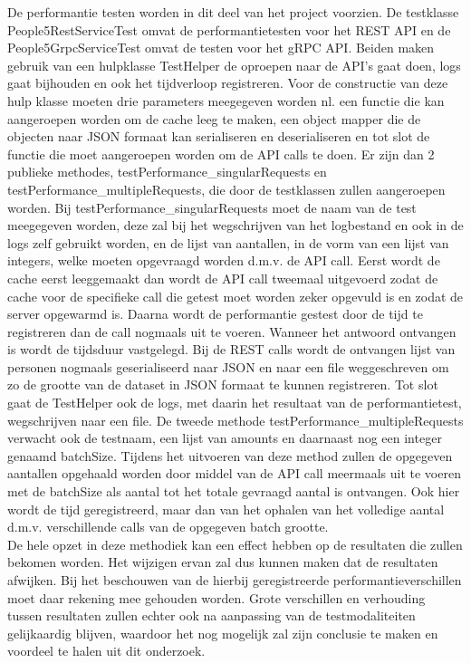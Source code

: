 De performantie testen worden in dit deel van het project voorzien. De testklasse People5RestServiceTest omvat de performantietesten voor het REST API
en de People5GrpcServiceTest omvat de testen voor het gRPC API. Beiden maken gebruik van een hulpklasse TestHelper de oproepen naar de API's gaat doen,
logs gaat bijhouden en ook het tijdverloop registreren. Voor de constructie van deze hulp klasse moeten drie parameters meegegeven worden nl. een functie
die kan aangeroepen worden om de cache leeg te maken, een object mapper die de objecten naar JSON formaat kan serialiseren en deserialiseren en tot slot de
functie die moet aangeroepen worden om de API calls te doen. Er zijn dan 2 publieke methodes, testPerformance\_singularRequests en testPerformance\_multipleRequests,
die door de testklassen zullen aangeroepen worden. Bij testPerformance\_singularRequests moet de naam van de test meegegeven worden, deze zal bij het wegschrijven
van het logbestand en ook in de logs zelf gebruikt worden, en de lijst van aantallen, in de vorm van een lijst van integers, welke moeten opgevraagd worden
d.m.v. de API call. Eerst wordt de cache eerst leeggemaakt dan wordt de API call tweemaal uitgevoerd zodat de cache voor de specifieke call die getest moet worden
zeker opgevuld is en zodat de server opgewarmd is. Daarna wordt de performantie gestest door de tijd te registreren dan de call nogmaals uit te voeren.
Wanneer het antwoord ontvangen is wordt de tijdsduur vastgelegd. Bij de REST calls wordt de ontvangen lijst van personen nogmaals geserialiseerd naar JSON
en naar een file weggeschreven om zo de grootte van de dataset in JSON formaat te kunnen registreren.
Tot slot gaat de TestHelper ook de logs, met daarin het resultaat van de performantietest, wegschrijven naar een file.
De tweede methode testPerformance\_multipleRequests verwacht ook de testnaam, een lijst van amounts en daarnaast nog een integer genaamd batchSize.
Tijdens het uitvoeren van deze method zullen de opgegeven aantallen opgehaald worden door middel van de API call meermaals uit te voeren met de batchSize als aantal
tot het totale gevraagd aantal is ontvangen. Ook hier wordt de tijd geregistreerd, maar dan van het ophalen van het volledige aantal d.m.v.
verschillende calls van de opgegeven batch grootte.\\

De hele opzet in deze methodiek kan een effect hebben op de resultaten die zullen bekomen worden. Het wijzigen ervan zal dus kunnen maken dat de resultaten afwijken.
Bij het beschouwen van de hierbij geregistreerde performantieverschillen moet daar rekening mee gehouden worden. Grote verschillen en verhouding tussen resultaten zullen echter
ook na aanpassing van de testmodaliteiten gelijkaardig blijven, waardoor het nog mogelijk zal zijn conclusie te maken en voordeel te halen uit dit onderzoek.\\

